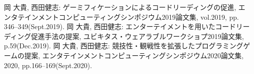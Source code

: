 \begin{thebibliography}{99}
  岡 大貴, 西田健志: ゲーミフィケーションによるコードリーディングの促進, エンタテインメントコンピューティングシンポジウム2019論文集, vol.2019, pp. 346--349(Sept.2019).
  岡 大貴, 西田健志: エンターテイメントを用いたコードリーディング促進手法の提案, ユビキタス・ウェアラブルワークショプ2019論文集, p.59(Dec.2019).
  岡 大貴, 西田健志: 競技性・観戦性を拡張したプログラミングゲームの提案, エンタテインメントコンピューティングシンポジウム2020論文集, 2020, pp.166--169(Sept.2020).
\end{thebibliography}